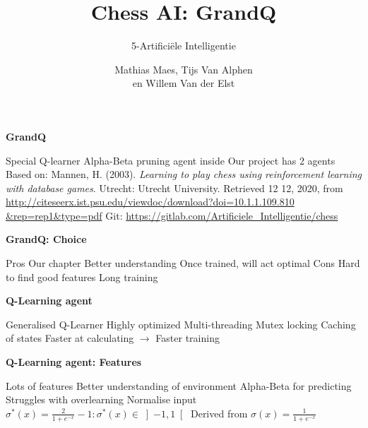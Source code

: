 \documentclass[compress]{beamer}
\title{Chess AI: GrandQ}
\subtitle{5-Artificiële Intelligentie}
\author{Mathias Maes, Tijs Van Alphen\\ en Willem Van der Elst}
\newcommand{\slidetitle}[1]{\textbf{\Large{#1}}\vspace{5mm}}
\begin{document}
\maketitle


\begin{frame}
    \slidetitle{GrandQ}
    \begin{outline}
        \1 Special Q-learner
            \2 Alpha-Beta pruning agent inside
        \1 Our project has 2 agents
        \1 Based on:
            \2 Mannen, H. (2003). \textit{Learning to play chess using reinforcement learning with database games}. Utrecht: Utrecht University. Retrieved 12 12, 2020, from \href{http://citeseerx.ist.psu.edu/viewdoc/download?doi=10.1.1.109.810&rep=rep1&type=pdf}{http://citeseerx.ist.psu.edu/viewdoc/download?doi=10.1.1.109.810\\\&rep=rep1\&type=pdf}
            \1 Git: \href{https://gitlab.com/Artificiele_Intelligentie/chess}{https://gitlab.com/Artificiele\_Intelligentie/chess}
    \end{outline}

\end{frame}

\begin{frame}
    \slidetitle{GrandQ: Choice}
    \begin{outline}
        \1 Pros
            \2 Our chapter
                \3 Better understanding
            \2 Once trained, will act optimal
        \1 Cons
            \2 Hard to find good features
            \2 Long training
    \end{outline}
\end{frame}

\begin{frame}
    \slidetitle{Q-Learning agent}
    \begin{outline}
        \1 Generalised Q-Learner
        \1 Highly optimized
            \2 Multi-threading
                \3 Mutex locking
            \2 Caching of states
        \1 Faster at calculating $\rightarrow$ Faster training
    \end{outline}
\end{frame}

\begin{frame}
    \slidetitle{Q-Learning agent: Features}
    \begin{outline}
        \1 Lots of features
            \2 Better understanding of environment
            \2 Alpha-Beta for predicting
        \1 Struggles with overlearning
            \2 Normalise input
            \2 $\sigma^*(x) = \frac{2}{1 + e^{-x}} -1: \sigma^*(x) \in \left]-1, 1\right[ $ 
            \3 Derived from $\sigma(x) = \frac{1}{1+e^{-x}}$
    \end{outline}
\end{frame}
\end{document}
